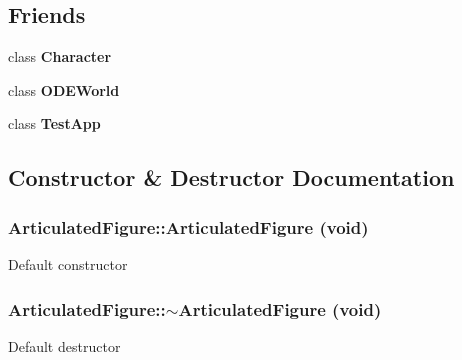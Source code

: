 \subsection*{Friends}
\begin{DoxyCompactItemize}
\item 
\hypertarget{classCartWheel_1_1Physics_1_1ArticulatedFigure_a761b6af109db683a0a78e82f9417d975}{
class {\bfseries Character}}
\label{classCartWheel_1_1Physics_1_1ArticulatedFigure_a761b6af109db683a0a78e82f9417d975}

\item 
\hypertarget{classCartWheel_1_1Physics_1_1ArticulatedFigure_a5db30e1aef955cb40c04658eacff8680}{
class {\bfseries ODEWorld}}
\label{classCartWheel_1_1Physics_1_1ArticulatedFigure_a5db30e1aef955cb40c04658eacff8680}

\item 
\hypertarget{classCartWheel_1_1Physics_1_1ArticulatedFigure_a53f540ec72017006b082b2cb716644c1}{
class {\bfseries TestApp}}
\label{classCartWheel_1_1Physics_1_1ArticulatedFigure_a53f540ec72017006b082b2cb716644c1}

\end{DoxyCompactItemize}


\subsection{Constructor \& Destructor Documentation}
\hypertarget{classCartWheel_1_1Physics_1_1ArticulatedFigure_a26d393a08b33ae3d4b2cef1e9b5e9412}{
\subsubsection[{ArticulatedFigure}]{\setlength{\rightskip}{0pt plus 5cm}ArticulatedFigure::ArticulatedFigure (void)}}
\label{classCartWheel_1_1Physics_1_1ArticulatedFigure_a26d393a08b33ae3d4b2cef1e9b5e9412}
Default constructor \hypertarget{classCartWheel_1_1Physics_1_1ArticulatedFigure_a69dbcd2796663a6c9821bb0ba43dd79c}{
\subsubsection[{$\sim$ArticulatedFigure}]{\setlength{\rightskip}{0pt plus 5cm}ArticulatedFigure::$\sim$ArticulatedFigure (void)}}
\label{classCartWheel_1_1Physics_1_1ArticulatedFigure_a69dbcd2796663a6c9821bb0ba43dd79c}
Default destructor 

